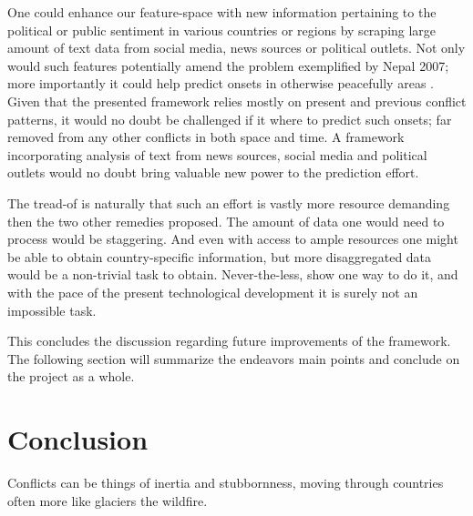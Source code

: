 \documentclass[a4paper]{article}
\begin{document}
One could enhance our feature-space with new information pertaining to the political or public sentiment in various countries or regions by scraping large amount of text data from social media, news sources or political outlets. Not only would such features potentially amend the problem exemplified by Nepal 2007; more importantly it could help predict onsets in otherwise peacefully areas \cite{mueller_2016}. Given that the presented framework relies mostly on present and previous conflict patterns, it would no doubt be challenged if it where to predict such onsets; far removed from any other conflicts in both space and time. A framework incorporating analysis of text from news sources, social media and political outlets would no doubt bring valuable new power to the prediction effort.\par

The tread-of is naturally that such an effort is vastly more resource demanding then the two other remedies proposed. The amount of data one would need to process would be staggering. And even with access to ample resources one might be able to obtain country-specific information, but more disaggregated data would be a non-trivial task to obtain. Never-the-less, \cite{mueller_2016} show one way to do it, and with the pace of the present technological development it is surely not an impossible task.\par 

This concludes the discussion regarding future improvements of the framework. The following section will summarize the endeavors main points and conclude on the project as a whole.\par

\section{Conclusion}

Conflicts can be things of inertia and stubbornness, moving through countries often more like glaciers the wildfire.






\end{document}
